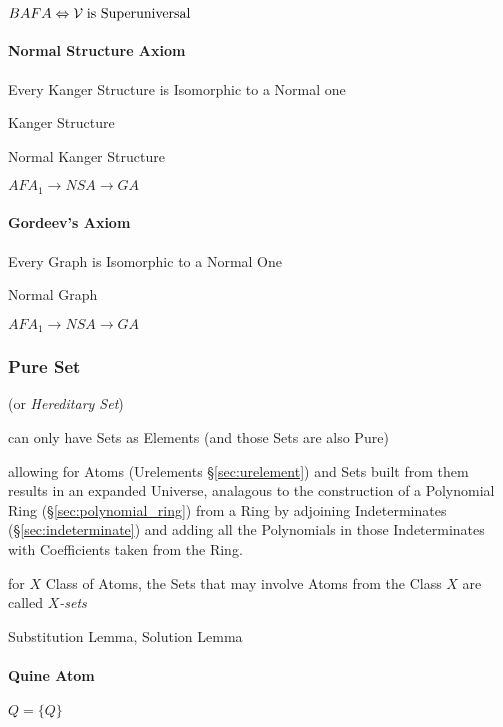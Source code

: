$BAFA \Leftrightarrow \mathcal{V} \;\text{is Superuniversal}$



\paragraph{Normal Structure Axiom}
\label{sec:normal_structure_axiom}\hfill

Every Kanger Structure is Isomorphic to a Normal one

Kanger Structure

Normal Kanger Structure

$AFA_1 \to NSA \to GA$


\paragraph{Gordeev's Axiom}\label{sec:gordeevs_axiom}\hfill

Every Graph is Isomorphic to a Normal One

Normal Graph

$AFA_1 \to NSA \to GA$



\subsubsection{Pure Set}\label{sec:pure_set}

(or \emph{Hereditary Set})

can only have Sets as Elements (and those Sets are also Pure)
\cite{aczel88}

allowing for Atoms (Urelements \S\ref{sec:urelement}) and Sets built
from them results in an expanded Universe, analagous to the
construction of a Polynomial Ring (\S\ref{sec:polynomial_ring}) from a
Ring by adjoining Indeterminates (\S\ref{sec:indeterminate}) and
adding all the Polynomials in those Indeterminates with Coefficients
taken from the Ring.

for $X$ Class of Atoms, the Sets that may involve Atoms from the Class
$X$ are called \emph{$X$-sets}

Substitution Lemma, Solution Lemma



\paragraph{Quine Atom}\label{sec:quine_atom}\hfill

$Q = \{Q\}$

